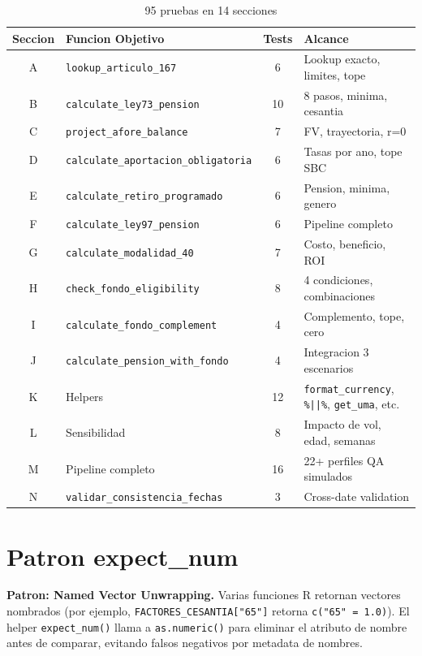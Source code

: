 \documentclass[11pt, letterpaper, twoside]{report}
\begin{document}
\begin{table}[h]
\centering
\caption{95 pruebas en 14 secciones}
\label{tab:tests}
\begin{tabularx}{\textwidth}{clcX}
\toprule
\textbf{Seccion} & \textbf{Funcion Objetivo} & \textbf{Tests} & \textbf{Alcance} \\
\midrule
A & \texttt{lookup\_articulo\_167} & 6 & Lookup exacto, limites, tope \\
B & \texttt{calculate\_ley73\_pension} & 10 & 8 pasos, minima, cesantia \\
C & \texttt{project\_afore\_balance} & 7 & FV, trayectoria, r=0 \\
D & \texttt{calculate\_aportacion\_obligatoria} & 6 & Tasas por ano, tope SBC \\
E & \texttt{calculate\_retiro\_programado} & 6 & Pension, minima, genero \\
F & \texttt{calculate\_ley97\_pension} & 6 & Pipeline completo \\
G & \texttt{calculate\_modalidad\_40} & 7 & Costo, beneficio, ROI \\
H & \texttt{check\_fondo\_eligibility} & 8 & 4 condiciones, combinaciones \\
I & \texttt{calculate\_fondo\_complement} & 4 & Complemento, tope, cero \\
J & \texttt{calculate\_pension\_with\_fondo} & 4 & Integracion 3 escenarios \\
K & Helpers & 12 & \texttt{format\_currency}, \texttt{\%||\%}, \texttt{get\_uma}, etc. \\
L & Sensibilidad & 8 & Impacto de vol, edad, semanas \\
M & Pipeline completo & 16 & 22+ perfiles QA simulados \\
N & \texttt{validar\_consistencia\_fechas} & 3 & Cross-date validation \\
\bottomrule
\end{tabularx}
\end{table}


\section{Patron expect\_num}

\begin{patronbox}
\textbf{Patron: Named Vector Unwrapping.} Varias funciones R retornan vectores
nombrados (por ejemplo, \texttt{FACTORES\_CESANTIA["65"]} retorna
\texttt{c("65" = 1.0)}). El helper \texttt{expect\_num()} llama a
\texttt{as.numeric()} para eliminar el atributo de nombre antes de comparar,
evitando falsos negativos por metadata de nombres.
\end{patronbox}
\end{document}
